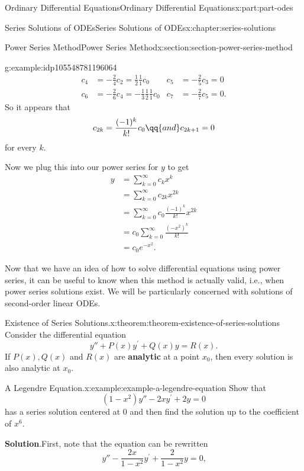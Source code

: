 \documentclass[oneside,10pt,]{book}
\newcommand{\blocktitlefont}{\relax}
\newcommand{\terminology}[1]{\textbf{#1}}
\numberwithin{equation}{part}
\newcommand{\amp}{&}
\begin{document}
\begin{partptx}{Ordinary Differential Equations}{}{Ordinary Differential Equations}{}{}{x:part:part-odes}
\begin{chapterptx}{Series Solutions of ODEs}{}{Series Solutions of ODEs}{}{}{x:chapter:series-solutions}
\begin{sectionptx}{Power Series Method}{}{Power Series Method}{}{}{x:section:section-power-series-method}
\begin{example}{}{g:example:idp105548781196064}
\begin{align*}
c_{4} \amp= -\frac{2}{4}c_{2} = \frac{1}{2}\frac{1}{1}c_{0} \amp c_{5} \amp= -\frac{2}{5}c_{3} = 0\\
c_{6} \amp= -\frac{2}{6}c_{4} = -\frac{1}{3}\frac{1}{2}\frac{1}{1}c_{0} \amp c_{7} \amp= -\frac{2}{7}c_{5} = 0\text{.}
\end{align*}
So it appears that%
\begin{equation*}
c_{2k} = \frac{(-1)^{k}}{k!}c_{0}\qq{and}c_{2k+1} = 0
\end{equation*}
for every \(k\).%
\par
Now we plug this into our power series for \(y\) to get%
\begin{align*}
y \amp= \sum_{k=0}^{\infty}c_{k}x^{k}\\
\amp= \sum_{k=0}^{\infty}c_{2k}x^{2k}\\
\amp= \sum_{k=0}^{\infty}c_{0}\frac{(-1)^{k}}{k!}x^{2k}\\
\amp= c_{0}\sum_{k=0}^{\infty}\frac{(-x^{2})^{k}}{k!}\\
\amp= c_{0}e^{-x^{2}}\text{.}
\end{align*}
%
\end{example}
Now that we have an idea of how to solve differential equations using power series, it can be useful to know when this method is actually valid, i.e., when power series solutions exist. We will be particularly concerned with solutions of second-order linear ODEs.%
\begin{theorem}{Existence of Series Solutions.}{}{x:theorem:theorem-existence-of-series-solutions}%
Consider the differential equation%
\begin{equation*}
y'' + P(x)y^\prime + Q(x)y = R(x)\text{.}
\end{equation*}
If \(P(x), Q(x)\) and \(R(x)\) are \terminology{analytic} at a point \(x_{0}\), then every solution is also analytic at \(x_{0}\).%
\end{theorem}
\begin{example}{A Legendre Equation.}{x:example:example-a-legendre-equation}%
Show that%
\begin{equation*}
(1 - x^{2})y'' - 2xy^\prime + 2y = 0
\end{equation*}
has a series solution centered at \(0\) and then find the solution up to the coefficient of \(x^{6}\).%
\par\smallskip%
\noindent\textbf{\blocktitlefont Solution}.\hypertarget{g:solution:idp105548781152800}{}\quad{}First, note that the equation can be rewritten%
\begin{equation*}
y'' - \frac{2x}{1 - x^{2}}y^\prime + \frac{2}{1 - x^{2}}y = 0\text{,}

\end{equation*}
\end{example}
\end{sectionptx}
\end{chapterptx}
\end{partptx}
\end{document}
